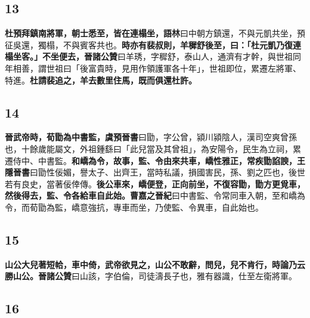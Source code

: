 \subsection*{13}

\textbf{杜預拜鎮南將軍，朝士悉至，皆在連榻坐，}{\footnotesize \textbf{語林}曰中朝方鎮還，不與元凱共坐，預征吳還，獨榻，不與賓客共也。}\textbf{時亦有裴叔則，羊穉舒後至，曰：「杜元凱乃復連榻坐客。」不坐便去，}{\footnotesize \textbf{晉諸公贊}曰羊琇，字穉舒，泰山人，通濟有才幹，與世祖同年相善，謂世祖曰「後富貴時，見用作領護軍各十年」，世祖即位，累遷左將軍、特進。}\textbf{杜請裴追之，羊去數里住馬，既而俱還杜許。}

\subsection*{14}

\textbf{晉武帝時，荀勖為中書監，}{\footnotesize \textbf{虞預晉書}曰勖，字公曾，潁川潁陰人，漢司空爽曾孫也，十餘歲能屬文，外祖鍾繇曰「此兒當及其曾祖」，為安陽令，民生為立祠，累遷侍中、中書監。}\textbf{和嶠為令，故事，監、令由來共車，嶠性雅正，常疾勖諂諛，}{\footnotesize \textbf{王隱晉書}曰勖性佞媚，譽太子、出齊王，當時私議，損國害民，孫、劉之匹也，後世若有良史，當著佞倖傳。}\textbf{後公車來，嶠便登，正向前坐，不復容勖，勖方更覓車，然後得去，監、令各給車自此始。}{\footnotesize \textbf{曹嘉之晉紀}曰中書監、令常同車入朝，至和嶠為令，而荀勖為監，嶠意強抗，專車而坐，乃使監、令異車，自此始也。}

\subsection*{15}

\textbf{山公大兒著短帢，車中倚，武帝欲見之，山公不敢辭，問兒，兒不肯行，時論乃云勝山公。}{\footnotesize \textbf{晉諸公贊}曰山該，字伯倫，司徒濤長子也，雅有器識，仕至左衛將軍。}

\subsection*{16}

